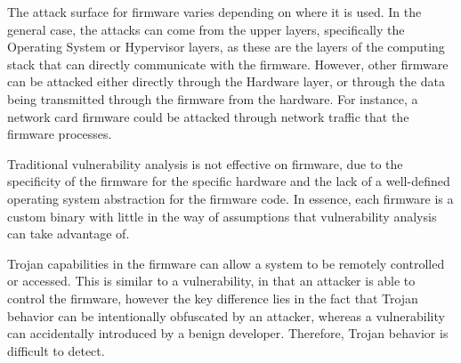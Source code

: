 \documentclass[11pt,letterpaper]{article}
\begin{document}

The attack surface for firmware varies depending on where it is used.
In the general case, the attacks can come from the upper layers,
specifically the Operating System or Hypervisor layers, as these are
the layers of the computing stack that can directly communicate with the
firmware. However, other firmware can be attacked either directly
through the Hardware layer, or through the data being
transmitted through the firmware from the hardware. For instance, a
network card firmware could be attacked through network traffic that
the firmware processes.

Traditional vulnerability analysis is not effective on firmware, due
to the specificity of the firmware for the specific hardware and the
lack of a well-defined operating system abstraction for the firmware
code. In essence, each firmware is a custom binary with little in the
way of assumptions that vulnerability analysis can take advantage of. 


Trojan capabilities in the firmware can allow a system to be
remotely controlled or accessed. This is similar to a vulnerability,
in that an attacker is able to control the firmware, however the key
difference lies in the fact that Trojan behavior can be intentionally
obfuscated by an attacker, whereas a vulnerability can accidentally
introduced by a benign developer. Therefore, Trojan behavior is 
difficult to detect.
\end{document}
